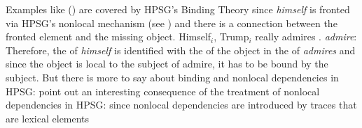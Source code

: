 \documentclass[output=paper,biblatex,babelshorthands,newtxmath,draftmode,colorlinks,citecolor=brown]{langscibook}
\begin{document}
Examples like () are covered by HPSG's Binding Theory since \emph{himself} is fronted via
HPSG's nonlocal mechanism (see ) and there is a connection between the
fronted element and the missing object.
\eal
\ex Himself$_i$, Trump$_i$ really admires \trace.
\ex \emph{admire}:\\
    \argst {}
\zl
Therefore, the \localv of \emph{himself} is identified with the \localv of the object in the \argstl of
\emph{admires} and since the object is local to the subject of admire, it has to be bound by the
subject. But there is more to say about binding and nonlocal dependencies in HPSG:
\citet[]{ps2} point out an interesting consequence of the treatment of nonlocal
dependencies in HPSG: since nonlocal dependencies are introduced by traces that are lexical elements
\end{document}

